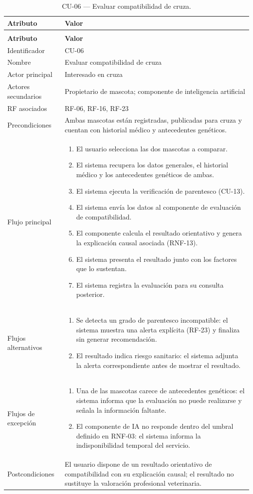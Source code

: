 \documentclass[journal,onecolumn]{IEEEtran}
\makeatletter
\newenvironment{atributos}[2]{%
	\small
	\begin{longtable}{@{}>{\raggedright\arraybackslash}p{4.2cm} >{\raggedright\arraybackslash}p{11.2cm}@{}}
		\caption{#2}\label{tab:#1}\\
		\toprule
		\textbf{Atributo} & \textbf{Valor} \\
		\midrule
		\endfirsthead
		\multicolumn{2}{@{}l}{\small\itshape (continuación)}\\
		\toprule
		\textbf{Atributo} & \textbf{Valor} \\
		\midrule
		\endhead
		\bottomrule
		\endlastfoot
	}{%
	\end{longtable}
	\normalsize
}
\makeatother
\begin{document}
	\begin{atributos}{CU-06}{CU-06 --- Evaluar compatibilidad de cruza.}
		Identificador & CU-06 \\
		Nombre & Evaluar compatibilidad de cruza \\
		Actor principal & Interesado en cruza \\
		Actores secundarios & Propietario de mascota; componente de inteligencia artificial \\
		RF asociados & RF-06, RF-16, RF-23 \\
		Precondiciones & Ambas mascotas están registradas, publicadas para cruza y cuentan con historial médico y antecedentes genéticos. \\
		Flujo principal &
		\begin{enumerate}[leftmargin=*, nosep]
			\item El usuario selecciona las dos mascotas a comparar.
			\item El sistema recupera los datos generales, el historial médico y los antecedentes genéticos de ambas.
			\item El sistema ejecuta la verificación de parentesco (CU-13).
			\item El sistema envía los datos al componente de evaluación de compatibilidad.
			\item El componente calcula el resultado orientativo y genera la explicación causal asociada (RNF-13).
			\item El sistema presenta el resultado junto con los factores que lo sustentan.
			\item El sistema registra la evaluación para su consulta posterior.
		\end{enumerate} \\
		Flujos alternativos &
		\begin{enumerate}[leftmargin=*, nosep]
			\item[3.1] Se detecta un grado de parentesco incompatible: el sistema muestra una alerta explícita (RF-23) y finaliza sin generar recomendación.
			\item[6.1] El resultado indica riesgo sanitario: el sistema adjunta la alerta correspondiente antes de mostrar el resultado.
		\end{enumerate} \\
		Flujos de excepción &
		\begin{enumerate}[leftmargin=*, nosep]
			\item[2.1] Una de las mascotas carece de antecedentes genéticos: el sistema informa que la evaluación no puede realizarse y señala la información faltante.
			\item[5.1] El componente de IA no responde dentro del umbral definido en RNF-03: el sistema informa la indisponibilidad temporal del servicio.
		\end{enumerate} \\
		Postcondiciones & El usuario dispone de un resultado orientativo de compatibilidad con su explicación causal; el resultado no sustituye la valoración profesional veterinaria. \\
	\end{atributos}
	
\end{document}
